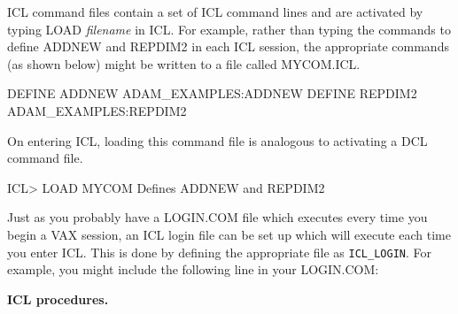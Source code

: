 \documentclass[twoside,11pt,nolof]{starlink}
\begin{document}
ICL command files contain a set of ICL command lines
and are activated by typing LOAD {\sl filename} in ICL.
For example, rather than typing the commands to define ADDNEW and REPDIM2
in each ICL session, the appropriate commands (as shown below) might be
written to  a file called MYCOM.ICL.
\begin{terminalv}
DEFINE ADDNEW  ADAM_EXAMPLES:ADDNEW
DEFINE REPDIM2 ADAM_EXAMPLES:REPDIM2
\end{terminalv}
On entering ICL, loading this command file is analogous to activating a DCL
command file.
\begin{terminalv}
ICL> LOAD MYCOM         {Defines ADDNEW and REPDIM2}
\end{terminalv}
Just as you probably have a  LOGIN.COM file which  executes every time
you begin a VAX session,
an ICL login file can be set up which will execute each time
you enter ICL.
This is done by defining the appropriate file as \texttt{ICL\_LOGIN}.
For example, you might include the following line in your LOGIN.COM:


{\large\bf ICL procedures.}
\end{document}
